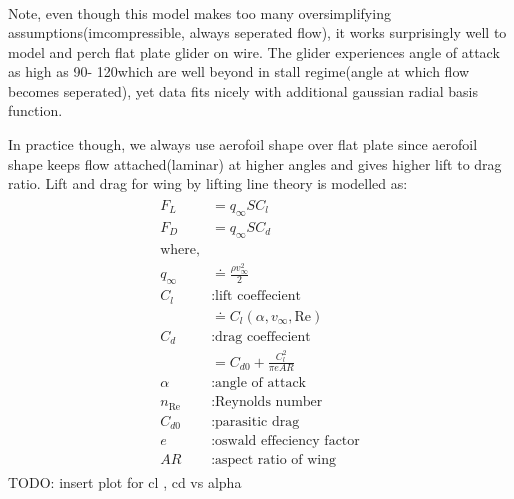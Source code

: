 \begin{align*}
\end{align*}

Note, even though this model makes too many oversimplifying assumptions(imcompressible, always seperated flow), it works surprisingly well to model\cite{cory2008experiments} and perch flat plate glider on wire\cite{moore2014robust}. The glider experiences angle of attack as high as 90\textdegree - 120\textdegree which are well beyond in stall regime(angle at which flow becomes seperated), yet data fits nicely with additional gaussian radial basis function.

In practice though, we always use aerofoil shape over flat plate since aerofoil shape keeps flow attached(laminar) at higher angles and gives higher lift to drag ratio. Lift and drag for wing by lifting line theory is modelled as:
\begin{align}
    \label{eq:airfoil}
    \begin{split}
        F_L &= q_\infty S C_l \\
        F_D &= q_\infty S C_d \\
        \text{where,}\\
        q_\infty &\doteq \frac{\rho v_\infty^2}{2} \\
        C_l &: \text{lift coeffecient}\\
        &\doteq C_l(\alpha, v_\infty, \text{Re})\\
        C_d &: \text{drag coeffecient}\\
        &= C_{d0} + \frac{C_l^2}{\pi e AR}\\
        \alpha&:\text{angle of attack}\\
        n_\text{Re}&: \text{Reynolds number}\\
        C_{d0} &: \text{parasitic drag} \\
        e &: \text{oswald effeciency factor} \\
        AR &: \text{aspect ratio of wing}
    \end{split}
\end{align}
TODO: insert plot for cl , cd vs alpha


